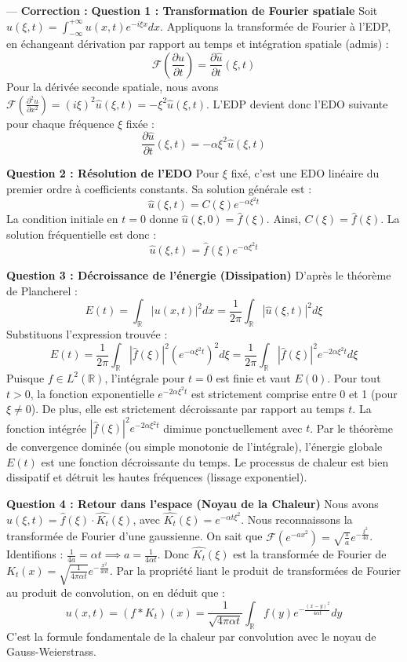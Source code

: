 \documentclass[11pt,a4paper]{article}
\begin{document}
---
\textbf{Correction :}
\textbf{Question 1 : Transformation de Fourier spatiale}
Soit $\hat{u}(\xi, t) = \int_{-\infty}^{+\infty} u(x,t) e^{-i\xi x} dx$.
Appliquons la transformée de Fourier à l'EDP, en échangeant dérivation par rapport au temps et intégration spatiale (admis) :
$$ \mathcal{F}\left(\frac{\partial u}{\partial t}\right) = \frac{\partial \hat{u}}{\partial t}(\xi, t) $$
Pour la dérivée seconde spatiale, nous avons $\mathcal{F}(\frac{\partial^2 u}{\partial x^2}) = (i\xi)^2 \hat{u}(\xi, t) = -\xi^2 \hat{u}(\xi, t)$.
L'EDP devient donc l'EDO suivante pour chaque fréquence $\xi$ fixée :
$$ \frac{\partial \hat{u}}{\partial t}(\xi, t) = -\alpha \xi^2 \hat{u}(\xi, t) $$

\textbf{Question 2 : Résolution de l'EDO}
Pour $\xi$ fixé, c'est une EDO linéaire du premier ordre à coefficients constants. Sa solution générale est :
$$ \hat{u}(\xi, t) = C(\xi) e^{-\alpha \xi^2 t} $$
La condition initiale en $t=0$ donne $\hat{u}(\xi, 0) = \hat{f}(\xi)$. Ainsi, $C(\xi) = \hat{f}(\xi)$.
La solution fréquentielle est donc :
$$ \hat{u}(\xi, t) = \hat{f}(\xi) e^{-\alpha \xi^2 t} $$

\textbf{Question 3 : Décroissance de l'énergie (Dissipation)}
D'après le théorème de Plancherel :
$$ E(t) = \int_{\mathbb{R}} |u(x,t)|^2 dx = \frac{1}{2\pi} \int_{\mathbb{R}} |\hat{u}(\xi, t)|^2 d\xi $$
Substituons l'expression trouvée :
$$ E(t) = \frac{1}{2\pi} \int_{\mathbb{R}} |\hat{f}(\xi)|^2 \left(e^{-\alpha \xi^2 t}\right)^2 d\xi = \frac{1}{2\pi} \int_{\mathbb{R}} |\hat{f}(\xi)|^2 e^{-2\alpha \xi^2 t} d\xi $$
Puisque $f \in L^2(\mathbb{R})$, l'intégrale pour $t=0$ est finie et vaut $E(0)$.
Pour tout $t > 0$, la fonction exponentielle $e^{-2\alpha \xi^2 t}$ est strictement comprise entre 0 et 1 (pour $\xi \neq 0$). De plus, elle est strictement décroissante par rapport au temps $t$.
La fonction intégrée $|\hat{f}(\xi)|^2 e^{-2\alpha \xi^2 t}$ diminue ponctuellement avec $t$. Par le théorème de convergence dominée (ou simple monotonie de l'intégrale), l'énergie globale $E(t)$ est une fonction décroissante du temps. Le processus de chaleur est bien dissipatif et détruit les hautes fréquences (lissage exponentiel).

\textbf{Question 4 : Retour dans l'espace (Noyau de la Chaleur)}
Nous avons $\hat{u}(\xi, t) = \hat{f}(\xi) \cdot \hat{K_t}(\xi)$, avec $\hat{K_t}(\xi) = e^{-\alpha t \xi^2}$.
Nous reconnaissons la transformée de Fourier d'une gaussienne. On sait que $\mathcal{F}(e^{-ax^2}) = \sqrt{\frac{\pi}{a}} e^{-\frac{\xi^2}{4a}}$.
Identifions : $\frac{1}{4a} = \alpha t \implies a = \frac{1}{4\alpha t}$.
Donc $\hat{K_t}(\xi)$ est la transformée de Fourier de $K_t(x) = \sqrt{\frac{1}{4\pi \alpha t}} e^{-\frac{x^2}{4\alpha t}}$.
Par la propriété liant le produit de transformées de Fourier au produit de convolution, on en déduit que :
$$ u(x,t) = (f * K_t)(x) = \frac{1}{\sqrt{4\pi \alpha t}} \int_{\mathbb{R}} f(y) e^{-\frac{(x-y)^2}{4\alpha t}} dy $$
C'est la formule fondamentale de la chaleur par convolution avec le noyau de Gauss-Weierstrass.
\end{document}
